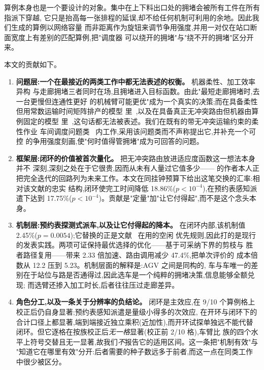 \documentclass[manuscript,screen,review]{acmart}
\newcommand{\NCases}{10}
\newcommand{\GainLoopRule}{18.86\%}      %
\newcommand{\PLoopRule}{<10^{-4}}
\newcommand{\GainLoopProbe}{17.75\%}     %
\newcommand{\PLoopProbe}{<10^{-4}}
\newcommand{\GainProbeLoop}{2.45\%}      %
\newcommand{\PProbeLoop}{=0.0054}
\newcommand{\CellsSigLoopAdj}{9}
\newcommand{\CellsSigProbe}{2}
\newcommand{\SpeedupProbe}{2.33}
\newcommand{\RouteCallCut}{47.4\%}
\newcommand{\CostMultBefore}{12.2}
\newcommand{\CostMultAfter}{5.23}
\begin{document}
算例本身也是一个要设计的对象。集中在上下料出口处的拥堵会被所有工件在所有指派下穿越,
它只是抬高每一张排程的延误,却不给任何机制可利用的余地。因此我们生成的算例以网络容量
而非距离作为旋钮来调节争用强度,并用一对仅在站口断面宽度上有差别的匹配算例,把"调度器
可以绕开的拥堵"与"绕不开的拥堵"区分开来。

本文的贡献如下。

\begin{enumerate}[leftmargin=*]

\item \textbf{问题层:一个在最接近的两类工作中都无法表述的权衡。} 机器柔性、加工效率异构
与走廊拥堵三者同时在场,且拥堵进入目标函数。由此"最短走廊拥堵时,去一台更慢但连通性更好
的机械臂可能更优"成为一个真实的决策;而在具备柔性但用常数运输时间矩阵排产的模型
里~\cite{sun2023integrated},以及在具备真正无冲突路由但机器由算例固定的模型
里~\cite{li2026framework},这句话都无法被表述。我们在既有的带无冲突运输约束的柔性作业
车间调度问题类~\cite{vanos2026exact} 内工作,采用该问题类而不声称提出它,并补充一个可控
的争用强度刻画,使"何时值得管拥堵"成为可回答的问题。

\item \textbf{框架层:闭环的价值被首次量化。} 把无冲突路由放进适应度函数这一想法本身并不
深刻,深刻之处在于它很贵,因而从未有人量过它值多少——\cite{li2026framework} 的作者本人正
把完全迭代的回路列为未来工作。本文在同挂钟预算下给出这笔交换的汇率:相对该文献的忠实
结构,闭环使完工时间降低 \GainLoopRule{}($p\PLoopRule$),在预约表感知派遣下达到
\GainLoopProbe{}($p\PLoopProbe$)。贡献是"定量"加"让它付得起",而不是这个念头本身。

\item \textbf{机制层:预约表探测式派车,以及让它付得起的降本。} 在闭环内部,该机制值
\GainProbeLoop{}($p\PProbeLoop$);它替换的正是文献~\cite{li2026framework} 在用的空闲
优先规则,因此打的是现行的发表实践。两项可证保持最优选择的优化——基于可采纳下界的剪枝与
胜者路径复用——带来 \SpeedupProbe{} 倍加速、路由调用减少 \RouteCallCut{},把单次评价的
成本倍数从 \CostMultBefore{} 压到 \CostMultAfter{}。机制层面的解释是:AGV 之间是同构的,
车与车唯一的差别在于站位与路是否通得过,因此选车是一个纯粹的拥堵决策,信息能够全额兑现;
而选臂还掺入加工时长,后者往往压过走廊差异。

\item \textbf{角色分工,以及一条关于分辨率的负结论。} 闭环是主效应,在
\CellsSigLoopAdj{}/\NCases{} 个算例格上校正后仍自身显著;预约表感知派遣是量级小得多的次效应,
在开环与闭环下的合计口径上都显著,端到端接近独立乘积(近加性),而开环试探单独远不能代替
闭环。但它逐格在按族校正后\emph{无一格}显著(校正前 \CellsSigProbe{}/\NCases{} 格),车臂比
族的四个水平上符号交替且无一显著,故我们\emph{不}报告它的适用区间。这一条把"机制有效"与
"知道它在哪里有效"分开:后者需要的种子数远多于前者,而这一点在同类工作中很少被区分。


\end{enumerate}
\end{document}
